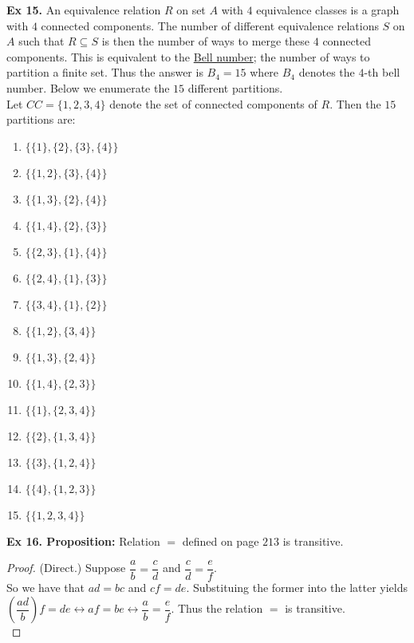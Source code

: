 \documentclass{article}
\begin{document}
\noindent \textbf{Ex 15.} An equivalence relation $R$ on set $A$ with $4$ equivalence classes is a graph with $4$ connected components. The number of different equivalence relations $S$ on $A$ such that $R \subseteq S$ is then the number of ways to merge these $4$ connected components. This is equivalent to the \href{https://en.wikipedia.org/wiki/Bell_number}{Bell number}; the number of ways to partition a finite set. Thus the answer is $B_4 = 15$ where $B_4$ denotes the $4$-th bell number. Below we enumerate the $15$ different partitions.\\
 

\noindent Let $CC=\{1,2,3,4\}$ denote the set of connected components of $R$. Then the $15$ partitions are:\\
\begin{enumerate}
	\item $\{\{1\},\{2\},\{3\},\{4\}\}$
	\item $\{\{1,2\},\{3\},\{4\}\}$
	\item $\{\{1,3\},\{2\},\{4\}\}$
	\item $\{\{1,4\},\{2\},\{3\}\}$
	\item $\{\{2,3\},\{1\},\{4\}\}$
	\item $\{\{2,4\},\{1\},\{3\}\}$
	\item $\{\{3,4\},\{1\},\{2\}\}$
	\item $\{\{1,2\},\{3,4\}\}$
	\item $\{\{1,3\},\{2,4\}\}$
	\item $\{\{1,4\},\{2,3\}\}$
	\item $\{\{1\},\{2,3,4\}\}$
	\item $\{\{2\},\{1,3,4\}\}$
	\item $\{\{3\},\{1,2,4\}\}$
	\item $\{\{4\},\{1,2,3\}\}$
	\item $\{\{1,2,3,4\}\}$
\end{enumerate}

\noindent \textbf{Ex 16. Proposition:} Relation $=$ defined on page $213$ is transitive.
\begin{proof}
(Direct.) Suppose $\dfrac{a}{b} = \dfrac{c}{d}$ and $\dfrac{c}{d} = \dfrac{e}{f}$.\\
So we have that $ad=bc$ and $cf=de$. Substituing the former into the latter yields $\left(\dfrac{ad}{b}\right) f=de \leftrightarrow af = be \leftrightarrow \dfrac{a}{b} = \dfrac{e}{f}$. Thus the relation $=$ is transitive.\\
\end{proof}
\end{document}
